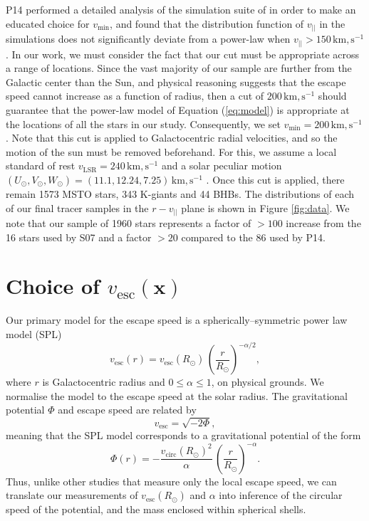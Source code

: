 \documentclass[useAMS,twocolumn,usenatbib]{mn2e}
\def\km,s{{\,\mathrm{km,s^{-1}}}}
\def\vlos{{v_{||}}}
\def\vesc{{v_\mathrm{esc}}}
\def\pos{{\boldsymbol{x}}}
\begin{document}
P14 performed a detailed analysis of the simulation suite of \citet{Sc09} in order to make an educated choice for $v_\mathrm{min}$, and found that the distribution function of $\vlos$ in the simulations does not significantly deviate from a power-law when $\vlos>150\km,s$. 
In our work, we must consider the fact that our cut must be appropriate across a range of locations. 
Since the vast majority of our sample are further from the Galactic center than the Sun, and physical reasoning suggests that the escape speed cannot increase as a function of radius, then a cut of $200\km,s$ should guarantee that the power-law model of Equation (\ref{eq:model}) is appropriate at the locations of all the stars in our study. 
Consequently, we set $v_\mathrm{min}=200\km,s$.  
Note that this cut is applied to Galactocentric radial velocities, and so the motion of the sun must be removed beforehand. 
For this, we assume a local standard of rest $v_\mathrm{LSR} = 240\km,s$ and a solar peculiar motion $\left(U_\odot,V_\odot,W_\odot\right) = \left(11.1,12.24,7.25\right)\km,s$ \citep{Sc10}.
Once this cut is applied, there remain 1573 MSTO stars, 343 K-giants and 44 BHBs. 
The distributions of each of our final tracer samples in the $r-\vlos$ plane is shown in Figure \ref{fig:data}. 
We note that our sample of 1960 stars represents a factor of $>100$ increase from the 16 stars used by S07 and a factor $>20$ compared to the 86 used by P14.

\section{Choice of $\vesc(\pos)$}

\label{sec:pot}

Our primary model for the escape speed is a spherically--symmetric power law model (SPL)
%
\begin{equation}
\vesc(r) = \vesc(R_\odot)\,\left(\dfrac{r}{R_\odot}\right)^{-\alpha/2},
\end{equation}
%
where $r$ is Galactocentric radius and $0 \leq \alpha \leq 1$, on physical grounds.  
We normalise the model to the escape speed at the solar radius. 
The gravitational potential $\Phi$ and escape speed are related by
%
\begin{equation}
\vesc = \sqrt{-2\Phi},
\end{equation}
%
meaning that the SPL model corresponds to a gravitational potential of the form
%
\begin{equation}
\Phi(r) = -\dfrac{v_\mathrm{circ}(R_\odot)^2}{\alpha}\,\left(\dfrac{r}{R_\odot}\right)^{-\alpha}.
\label{eq:splgrav}
\end{equation}
%
Thus, unlike other studies that measure only the local escape speed, we can translate our measurements of $\vesc(R_\odot)$ and $\alpha$ into inference of the circular speed of the potential, and the mass enclosed within spherical shells. 
\end{document}
